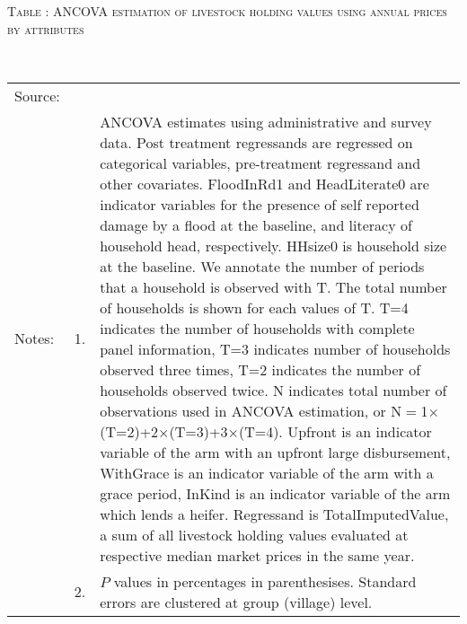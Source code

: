 \hspace{-1cm}\begin{minipage}[t]{14cm}
\hfil\textsc{\normalsize Table \thetable: ANCOVA estimation of livestock holding values using annual prices by attributes\label{tab ANCOVA livestock  annual price attributes}}\\
\setlength{\tabcolsep}{1pt}
\setlength{\baselineskip}{8pt}
\renewcommand{\arraystretch}{.55}
\hfil{}\\
\renewcommand{\arraystretch}{.8}
\setlength{\tabcolsep}{1pt}
\begin{tabular}{>{\hfill\scriptsize}p{1cm}<{}>{\hfill\scriptsize}p{.25cm}<{}>{\scriptsize}p{12cm}<{\hfill}}
Source:& \multicolumn{2}{l}{\scriptsize Estimated with GUK administrative and survey data.}\\
Notes: & 1. & ANCOVA estimates using administrative and survey data. Post treatment regressands are regressed on categorical variables, pre-treatment regressand and other covariates. \textsf{FloodInRd1} and \textsf{HeadLiterate0} are indicator variables for the presence of self reported damage by a flood at the baseline, and literacy of household head, respectively. \textsf{HHsize0} is household size at the baseline. We annotate the number of periods that a household is observed with \textsf{T}. The total number of households is shown for each values of \textsf{T}. \textsf{T=4} indicates the number of households with complete panel information, \textsf{T=3} indicates number of households observed three times, \textsf{T=2} indicates the number of households observed twice. \textsf{N} indicates total number of observations used in ANCOVA estimation, or \textsf{N$=$1$\times$(T=2)+2$\times$(T=3)+3$\times$(T=4)}.  \textsf{Upfront} is an indicator variable of the arm with an upfront large disbursement, \textsf{WithGrace} is an indicator variable of the arm with a grace period, \textsf{InKind} is an indicator variable of the arm which lends a heifer. Regressand is \textsf{TotalImputedValue}, a sum of all livestock holding values evaluated at respective median market prices in the same year. \\
& 2. & $P$ values in percentages in parenthesises. Standard errors are clustered at group (village) level.
\end{tabular}
\end{minipage}



